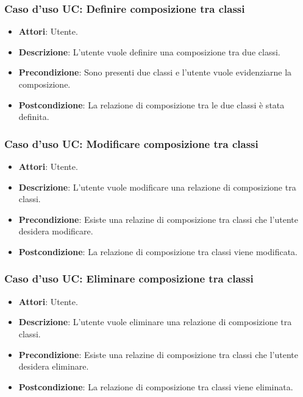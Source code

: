 \documentclass[../AnalisiDeiRequisiti.tex]{subfiles}
\begin{document}
		\subsubsection{Caso d'uso UC: Definire composizione tra classi}
		\begin{itemize}
			\item\textbf{Attori}: Utente.
			\item\textbf{Descrizione}: L'utente vuole definire una composizione tra due classi.
			\item\textbf{Precondizione}: Sono presenti due classi e l'utente vuole evidenziarne la composizione.
			\item\textbf{Postcondizione}: La relazione di composizione tra le due classi è stata definita.
		\end{itemize}
		
		\subsubsection{Caso d'uso UC:  Modificare composizione tra classi}
		\begin{itemize}
			\item\textbf{Attori}: Utente.
			\item\textbf{Descrizione}: L'utente vuole modificare una relazione di composizione tra classi.
			\item\textbf{Precondizione}: Esiste una relazine di composizione tra classi che l'utente desidera modificare.
			\item\textbf{Postcondizione}: La relazione di composizione tra classi viene modificata.
		\end{itemize}
		
		\subsubsection{Caso d'uso UC: Eliminare composizione tra classi}
		\begin{itemize}
			\item\textbf{Attori}: Utente.
			\item\textbf{Descrizione}: L'utente vuole eliminare una relazione di composizione tra classi.
			\item\textbf{Precondizione}: Esiste una relazine di composizione tra classi che l'utente desidera eliminare.
			\item\textbf{Postcondizione}: La relazione di composizione tra classi viene eliminata.
		\end{itemize}
		
\end{document}
